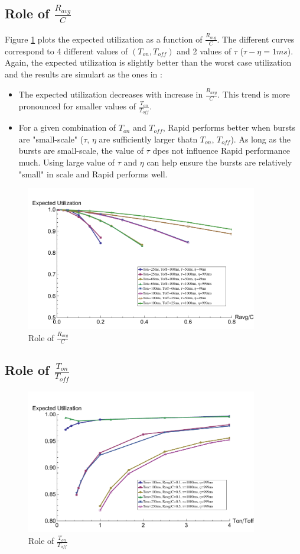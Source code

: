   \subsection{Role of $\frac{R_{avg}}{C}$}
    Figure \ref{rttravgc} plots the expected utilization as a function of 
    $\frac{R_{avg}}{C}$. The different curves correspond to 4 different 
    values of $(T_{on}, T_{off})$ and 2 values of 
    $\tau$ ($\tau - \eta = 1ms$). Again, the expected utilization is slightly 
    better than the worst case utilization and the results are simulart as the 
    ones in \cite{Lovewell2011-Noise-TR}:
    \begin{itemize}
      \item The expected utilization decreases with increase in 
      $\frac{R_{avg}}{C}$. This trend is more pronounced for smaller values of 
      $\frac{T_{on}}{T_{off}}$.
      \item For a given combination of $T_{on}$ and $T_{off}$, Rapid performs 
      better when bursts are "small-scale" ($\tau$, $\eta$ are sufficiently 
      larger thatn $T_{on}$, $T_{off}$). As long as the bursts are 
      small-scale, the value of $\tau$ dpes not influence Rapid performance 
      much. Using large value of $\tau$ and $\eta$ can help ensure the 
      bursts are relatively "small" in scale and Rapid performs well.
    \end{itemize}
    \begin{figure}[h]
      \centering
      \includegraphics[width=0.9\textwidth]{img/rttravgc.pdf}
      \caption{Role of $\frac{R_{avg}}{C}$}
      \label{rttravgc}
    \end{figure}

  \subsection{Role of $\frac{T_{on}}{T_{off}}$}
    \begin{figure}[h]
      \centering
      \includegraphics[width=0.9\textwidth]{img/rtttontoff.pdf}
      \caption{Role of $\frac{T_{on}}{T_{off}}$}
      \label{rtttontoff}
    \end{figure}

